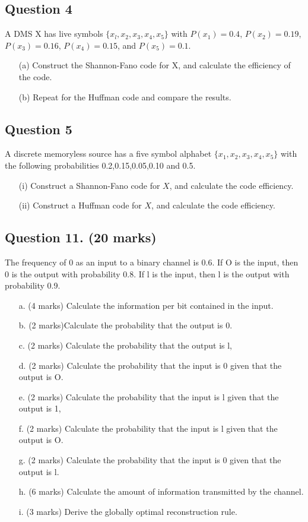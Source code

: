 \documentclass[a4paper,12pt]{article}
\begin{document}
\subsection*{Question 4}
A DMS X has live symbols $\{x_l,x_2,x_3,x_4,x_5\}$ with $P(x_1) = 0.4$, $P(x_2)=0.19$, $P(x_3) =0.16$,
$P(x_4) = 0.15$, and $P(x_5) = 0.1$.
\begin{itemize}
\item[(a)] Construct the Shannon-Fano code for X, and calculate the efficiency of the code.
\item[(b)] Repeat for the Huffman code and compare the results.
\end{itemize}

\subsection*{Question 5}

A discrete memoryless source has a five symbol alphabet $\{x_1,x_2,x_3,x_4,x_5\}$ with the following probabilities 0.2,0.15,0.05,0.10 and 0.5.

\begin{itemize}
\item[(i)] Construct a Shannon-Fano code for $X$, and calculate the code efficiency.
\item[(ii)] Construct a Huffman code for $X$, and calculate the code efficiency.
\end{itemize}

\subsection*{Question 11. (20 marks) }

The frequency of 0 as an input to a binary channel is 0.6. If O is the
input, then 0 is the output with probability 0.8. If l is the input, then l
is the output with probability 0.9.
\begin{itemize}
	\item[a.](4 marks) Calculate the information per bit contained in the input.
	\item[b.](2 marks)Calculate the probability that the output is 0.
	\item[c.](2 marks) Calculate the probability that the output is l,
	\item[d.](2 marks) Calculate the probability that the input is 0 given that the
	output is O.
	\item[e.](2 marks) Calculate the probability that the input is l given that
	the output is 1,
	\item[f.](2 marks) Calculate the probability that the input is l given that
	the output is O.
	\item[g.](2 marks) Calculate the probability that the input is 0 given that
	the output is l.
	\item[h.](6 marks) Calculate the amount of information transmitted by the channel.
	\item[i.](3 marks) Derive the globally optimal reconstruction rule.
\end{itemize}
\end{document}
